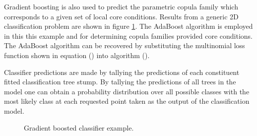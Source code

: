 Gradient boosting is also used to predict the parametric copula family which corresponds to a given set of local core conditions.  Results from a generic 2D classification problem are shown in figure \ref{fig:gb3}.  The AdaBoost algorithm is employed in this this example and for determining copula families provided core conditions.   The AdaBoost algorithm can be recovered by substituting the multinomial loss function shown in equation () into algorithm ().  

Classifier predictions are made by tallying the predictions of each constituent fitted classification tree stump.  By tallying the predictions of all trees in the model one can obtain a probability distribution over all possible classes with the most likely class at each requested point taken as the output of the classification model.

\begin{figure}[H]%
    \centering
    \qquad
    \caption[]{Gradient boosted classifier example.}%
    \label{fig:gb3}%
\end{figure}

